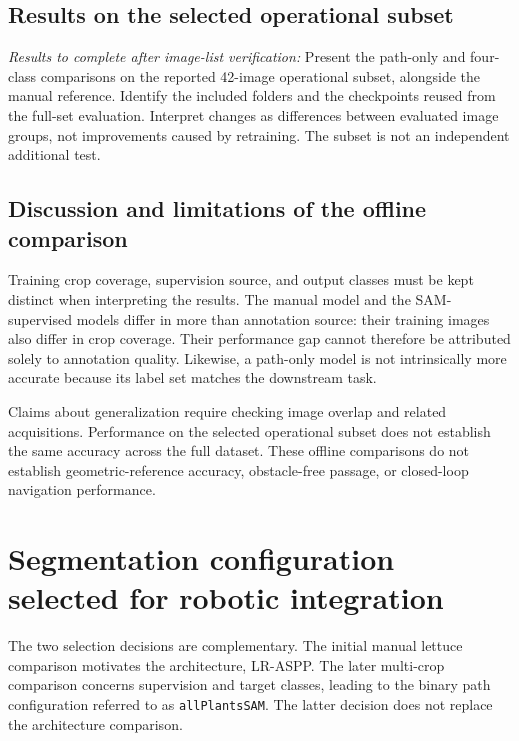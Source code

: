 \subsection{Results on the selected operational subset}
\label{subsec:c3_supervision_operational_results}

\emph{Results to complete after image-list verification:} Present the
path-only and four-class comparisons on the reported 42-image operational
subset, alongside the manual reference. Identify the included folders
and the checkpoints reused from the full-set evaluation. Interpret
changes as differences between evaluated image groups, not improvements
caused by retraining. The subset is not an independent additional test.

\subsection{Discussion and limitations of the offline comparison}
\label{subsec:c3_supervision_discussion}

Training crop coverage, supervision source, and output classes must be
kept distinct when interpreting the results. The manual model and the
SAM-supervised models differ in more than annotation source: their
training images also differ in crop coverage. Their performance gap
cannot therefore be attributed solely to annotation quality. Likewise,
a path-only model is not intrinsically more accurate because its label
set matches the downstream task.

Claims about generalization require checking image overlap and related
acquisitions. Performance on the selected operational subset does not
establish the same accuracy across the full dataset. These offline
comparisons do not establish geometric-reference accuracy, obstacle-free
passage, or closed-loop navigation performance.

\section{Segmentation configuration selected for robotic integration}
\label{sec:c3_deployment_selection}

The two selection decisions are complementary. The initial manual
lettuce comparison motivates the architecture, LR-ASPP. The later
multi-crop comparison concerns supervision and target classes, leading
to the binary path configuration referred to as \texttt{allPlantsSAM}.
The latter decision does not replace the architecture comparison.

